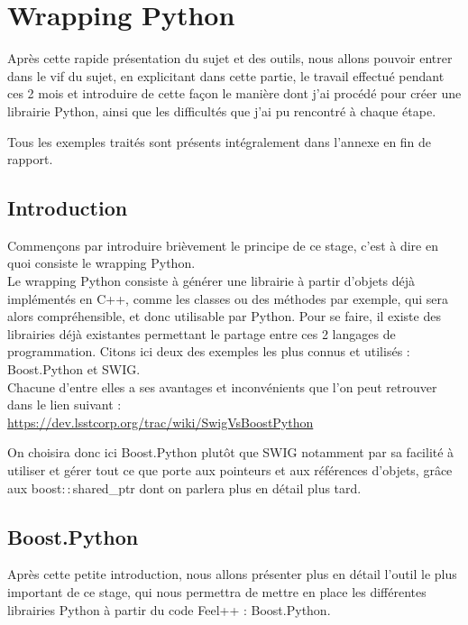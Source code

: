 \documentclass[french,12pt]{article}
\begin{document}
\section{Wrapping Python}
Après cette rapide présentation du sujet et des outils, nous allons pouvoir entrer dans le vif du sujet, en explicitant dans cette partie, le travail effectué pendant ces 2 mois et introduire de cette façon le manière dont j'ai procédé pour créer une librairie Python, ainsi que les difficultés que j'ai pu rencontré à chaque étape.
\newline

Tous les exemples traités sont présents intégralement dans l'annexe en fin de rapport.
\subsection{Introduction}

Commençons par introduire brièvement le principe de ce stage, c'est à dire en quoi consiste le wrapping Python.\\

Le wrapping Python consiste à générer une librairie à partir d'objets déjà implémentés en C++, comme les classes ou des méthodes par exemple, qui sera alors compréhensible, et donc utilisable par Python. Pour se faire, il existe des librairies déjà existantes permettant le partage entre ces 2 langages de programmation. Citons ici deux des exemples les plus connus et utilisés : Boost.Python et SWIG.\\ 

Chacune d'entre elles a ses avantages et inconvénients que l'on peut retrouver dans le lien suivant : \\
\url{https://dev.lsstcorp.org/trac/wiki/SwigVsBoostPython}
\vspace{0.5 cm}

On choisira donc ici Boost.Python plutôt que SWIG notamment par sa facilité à utiliser et gérer tout ce que porte aux pointeurs et aux références d'objets, grâce aux boost$::$shared\_ptr dont on parlera plus en détail plus tard.

\subsection{Boost.Python}
Après cette petite introduction, nous allons présenter plus en détail l'outil le plus important de ce stage, qui nous permettra de mettre en place les différentes librairies Python à partir du code Feel++ :  Boost.Python.
\newline
\end{document}

